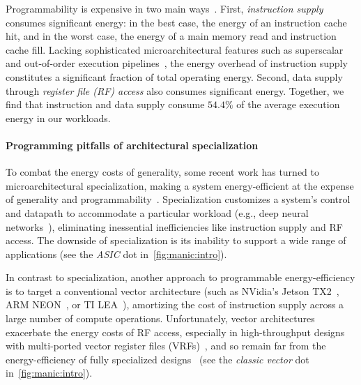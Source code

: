 Programmability is expensive in two main ways~\cite{horowitz:isscc14:energy-keynote,hameed2010understanding,balfour_elm_thesis}.
First, \emph{instruction supply} consumes significant energy: in the best case, the energy of
an instruction cache hit, and in the worst case, the energy of a main memory
read and instruction cache fill.  
%
Lacking sophisticated microarchitectural features such as superscalar and
out-of-order execution pipelines~\cite{msp430fr5994,traber2016pulpino}, the energy overhead of
instruction supply constitutes a significant fraction of total operating energy.
%
Second, data supply through \emph{register file (RF) access} also consumes significant energy.
%
Together, we find that instruction and data supply consume
$54.4\%$ of the average execution energy in our workloads.

\paragraph{Programming pitfalls of architectural specialization}
To combat the energy costs of generality, some recent work has turned to
microarchitectural specialization, making a system energy-efficient at the
expense of generality and
programmability~\cite{chen:isca16:eyeriss,chen:asplos14:diannao,du:isca15:shidiannao,liu:isca15:pudiannao,chen2014dadiannao,venkatesh2010conservation}.
Specialization customizes a system's control and datapath to accommodate a
particular workload (e.g., deep neural networks~\cite{chen:isca16:eyeriss,chen:asplos14:diannao}),
eliminating inessential inefficiencies like instruction supply and RF access.
The downside of specialization is its 
inability to support a wide range of applications (see the \textit{ASIC} dot in~\autoref{fig:manic:intro}).

In contrast to specialization, another approach to programmable
energy-efficiency is to target a conventional vector architecture (such as
NVidia's Jetson TX2~\cite{jetsontx2}, ARM NEON~\cite{neon}, or TI LEA~\cite{lea}), amortizing the cost of instruction
supply across a large number of compute operations. Unfortunately,
vector architectures exacerbate the energy costs of RF access,
especially in high-throughput designs with multi-ported vector register files (VRFs)~\cite{kozyrakis2003overcoming,asanovic1996t0,iram},
and so remain far from the energy-efficiency of fully specialized designs~\cite{hameed2010understanding} (see the \textit{classic vector} dot in~\autoref{fig:manic:intro}).

